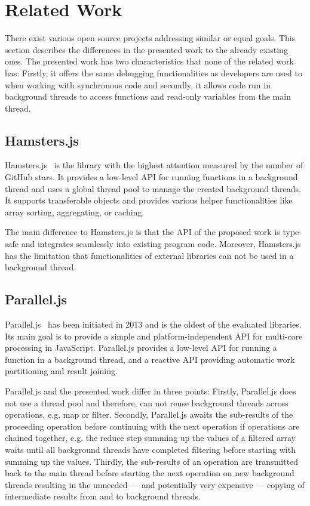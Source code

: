 \section{Related Work}\label{sec:related-work}
There exist various open source projects addressing similar or equal goals. This section describes the differences in the presented work to the already existing ones. The presented work has two characteristics that none of the related work has: Firstly, it offers the same debugging functionalities as developers are used to when working with synchronous code and secondly, it allows code run in background threads to access functions and read-only variables from the main thread.

\subsection{Hamsters.js}
Hamsters.js~\cite{hamstersjs} is the library with the highest attention measured by the number of GitHub stars. It provides a low-level API for running functions in a background thread and uses a global thread pool to manage the created background threads. It supports transferable objects and provides various helper functionalities like array sorting, aggregating, or caching.

The main difference to Hamsters.js is that the API of the proposed work is type-safe and integrates seamlessly into existing program code. Moreover, Hamsters.js has the limitation that functionalities of external libraries can not be used in a background thread.

\subsection{Parallel.js}
Parallel.js~\cite{SavitzkyMayr2016} has been initiated in 2013 and is the oldest of the evaluated libraries. Its main goal is to provide a simple and platform-independent API for multi-core processing in JavaScript. Parallel.js provides a low-level API for running a function in a background thread, and a reactive API providing automatic work partitioning and result joining. 

Parallel.js and the presented work differ in three points: Firstly, Parallel.js does not use a thread pool and therefore, can not reuse background threads across operations, e.g. map or filter. Secondly, Parallel.js awaits the sub-results of the proceeding operation before continuing with the next operation if operations are chained together, e.g. the reduce step summing up the values of a filtered array waits until all background threads have completed filtering before starting with summing up the values. Thirdly, the sub-results of an operation are transmitted back to the main thread before starting the next operation on new background threads resulting in the unneeded --- and potentially very expensive --- copying of intermediate results from and to background threads.


